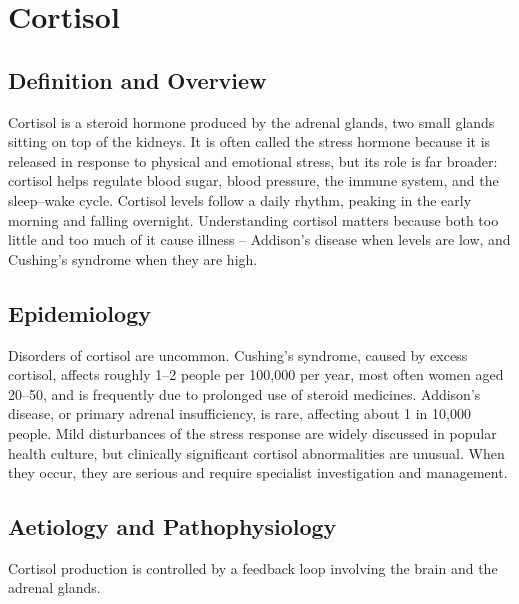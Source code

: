 \chapter{Cortisol}

\section*{Definition and Overview}
Cortisol is a steroid hormone produced by the adrenal glands, two small glands sitting on top of the kidneys. It is often called the stress hormone because it is released in response to physical and emotional stress, but its role is far broader: cortisol helps regulate blood sugar, blood pressure, the immune system, and the sleep--wake cycle. Cortisol levels follow a daily rhythm, peaking in the early morning and falling overnight. Understanding cortisol matters because both too little and too much of it cause illness -- Addison's disease when levels are low, and Cushing's syndrome when they are high.

\section*{Epidemiology}
Disorders of cortisol are uncommon. Cushing's syndrome, caused by excess cortisol, affects roughly 1--2 people per 100,000 per year, most often women aged 20--50, and is frequently due to prolonged use of steroid medicines. Addison's disease, or primary adrenal insufficiency, is rare, affecting about 1 in 10,000 people. Mild disturbances of the stress response are widely discussed in popular health culture, but clinically significant cortisol abnormalities are unusual. When they occur, they are serious and require specialist investigation and management.

\section*{Aetiology and Pathophysiology}
Cortisol production is controlled by a feedback loop involving the brain and the adrenal glands.

